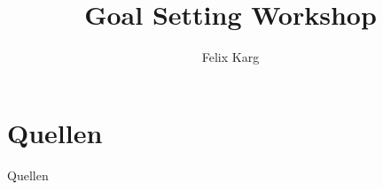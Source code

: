 \usepackage[ngerman, english]{babel}


\title{Goal Setting Workshop}
\author{Felix Karg}


\graphicspath{ {./img/} {../template/} {../template_tex/} } %

\newif\iftwocols
\twocolstrue





\newif\ifonline
\onlinefalse





% 





\section{Quellen}
\begin{frame}{Quellen}
% 


\end{frame}





